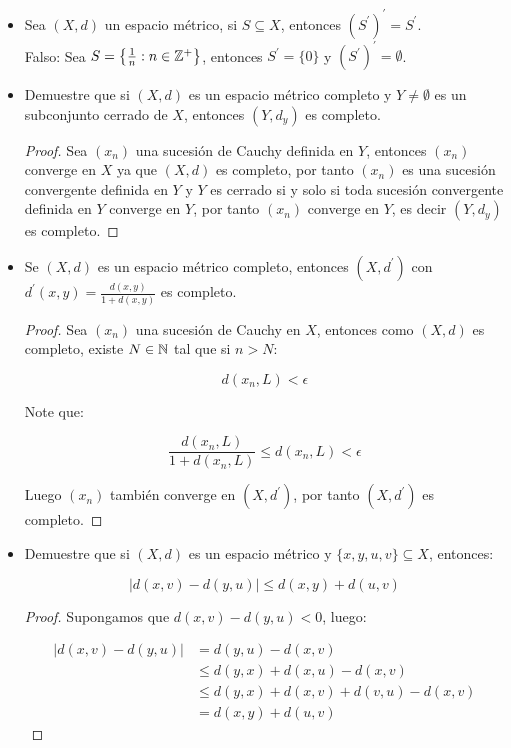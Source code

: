 \begin{itemize}[label={☠},leftmargin=*]
\begin{proof}
\end{proof}

\item Sea $(X,d)$ un espacio métrico, si $S\subseteq X$, entonces $(S^{\prime})^{\prime}=S^{\prime}$.\\

Falso: Sea $S=\left\{\frac{1}{n}: n\in \mathbb{Z}^+\right\}$, entonces $S^{\prime}=\{0\}$ y $(S^{\prime})^{\prime}=\emptyset$.\\

\item Demuestre que si $(X,d)$ es un espacio métrico completo y $Y\neq \emptyset$ es un subconjunto cerrado de $X$, entonces $(Y,d_y)$ es completo.\\

\begin{proof}
Sea $(x_n)$ una sucesión de Cauchy definida en $Y$, entonces $(x_n)$ converge en $X$ ya que $(X,d)$ es completo, por tanto $(x_n)$ es una sucesión convergente definida en $Y$ y $Y$ es cerrado si y solo si toda sucesión convergente definida en $Y$ converge en $Y$, por tanto $(x_n)$ converge en $Y$, es decir $(Y,d_y)$ es completo.
\end{proof}

\item Se $(X,d)$ es un espacio métrico completo, entonces $(X,d^{\prime})$ con $d^{\prime}(x,y)=\frac{d(x,y)}{1+d(x,y)}$ es completo.\\

\begin{proof}
Sea $(x_n)$ una sucesión de Cauchy en $X$, entonces como $(X,d)$ es completo, existe $N\in \mathbb{N}$ tal que si $n>N$:

$$d(x_n,L)<\epsilon$$

Note que:

$$\dfrac{d(x_n,L)}{1+d(x_n,L)}\leq d(x_n,L)<\epsilon$$

Luego $(x_n)$ también converge en $(X,d^{\prime})$, por tanto $(X,d^{\prime})$ es completo.
\end{proof}

\item Demuestre que si $(X,d)$ es un espacio métrico y $\{x,y,u,v\}\subseteq X$, entonces:

$$|d(x,v)-d(y,u)|\leq d(x,y)+d(u,v)$$

\begin{proof}
Supongamos que $d(x,v)-d(y,u)<0$, luego:

\begin{align*}
 |d(x,v)-d(y,u)|&=d(y,u)-d(x,v)\\
 &\leq d(y,x)+d(x,u)-d(x,v)\\
 &\leq d(y,x)+d(x,v)+d(v,u)-d(x,v)\\
 &=d(x,y)+d(u,v)  
\end{align*}


\end{proof}
\end{itemize}
